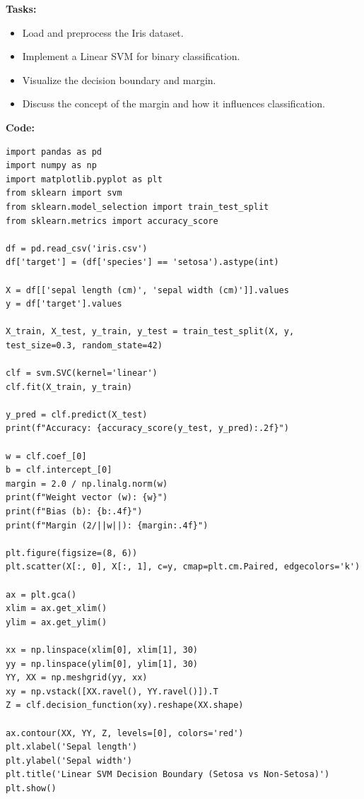 \documentclass[12pt, a4paper]{article}
\begin{document}
\vspace{\baselineskip}
\noindent \textbf{Tasks:}\\
\vspace{-0.5\baselineskip}
\begin{itemize}[nosep]
    \item Load and preprocess the Iris dataset.
    \item Implement a Linear SVM for binary classification.
    \item Visualize the decision boundary and margin.
    \item Discuss the concept of the margin and how it influences classification.
\end{itemize}

\vspace{\baselineskip}
\noindent \textbf{Code:}\\
\begin{lstlisting}
import pandas as pd
import numpy as np
import matplotlib.pyplot as plt
from sklearn import svm
from sklearn.model_selection import train_test_split
from sklearn.metrics import accuracy_score

df = pd.read_csv('iris.csv')
df['target'] = (df['species'] == 'setosa').astype(int)

X = df[['sepal length (cm)', 'sepal width (cm)']].values
y = df['target'].values

X_train, X_test, y_train, y_test = train_test_split(X, y, test_size=0.3, random_state=42)

clf = svm.SVC(kernel='linear')
clf.fit(X_train, y_train)

y_pred = clf.predict(X_test)
print(f"Accuracy: {accuracy_score(y_test, y_pred):.2f}")

w = clf.coef_[0]
b = clf.intercept_[0]
margin = 2.0 / np.linalg.norm(w)
print(f"Weight vector (w): {w}")
print(f"Bias (b): {b:.4f}")
print(f"Margin (2/||w||): {margin:.4f}")

plt.figure(figsize=(8, 6))
plt.scatter(X[:, 0], X[:, 1], c=y, cmap=plt.cm.Paired, edgecolors='k')

ax = plt.gca()
xlim = ax.get_xlim()
ylim = ax.get_ylim()

xx = np.linspace(xlim[0], xlim[1], 30)
yy = np.linspace(ylim[0], ylim[1], 30)
YY, XX = np.meshgrid(yy, xx)
xy = np.vstack([XX.ravel(), YY.ravel()]).T
Z = clf.decision_function(xy).reshape(XX.shape)

ax.contour(XX, YY, Z, levels=[0], colors='red')
plt.xlabel('Sepal length')
plt.ylabel('Sepal width')
plt.title('Linear SVM Decision Boundary (Setosa vs Non-Setosa)')
plt.show()


\end{lstlisting}
\end{document}
